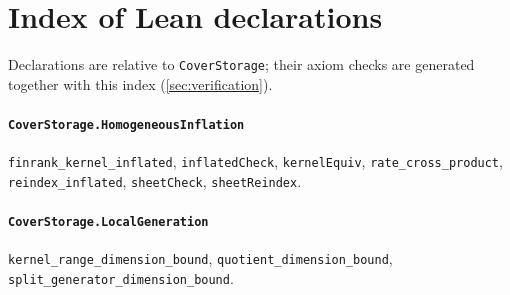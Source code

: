 \section{Index of Lean declarations}\label{sec:leanindex}

Declarations are relative to \texttt{CoverStorage}; their axiom checks are generated together with this index (\cref{sec:verification}).

\paragraph{\texttt{CoverStorage.HomogeneousInflation}}
{\small\raggedright \texttt{finrank\_kernel\_inflated}, \texttt{inflatedCheck}, \texttt{kernelEquiv}, \texttt{rate\_cross\_product}, \texttt{reindex\_inflated}, \texttt{sheetCheck}, \texttt{sheetReindex}.\par}

\paragraph{\texttt{CoverStorage.LocalGeneration}}
{\small\raggedright \texttt{kernel\_range\_dimension\_bound}, \texttt{quotient\_dimension\_bound}, \texttt{split\_generator\_dimension\_bound}.\par}
